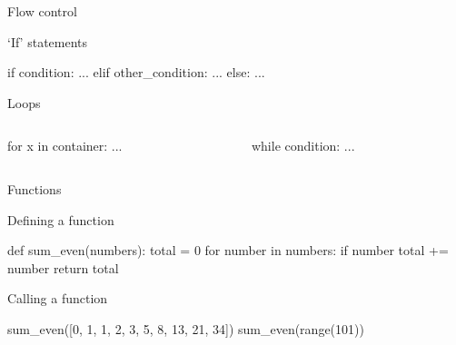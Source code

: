 \begin{frame}[fragile]{Flow control}
    \vspace{0.5em}
    \begin{block}{`If' statements}
        \begin{py3}
            if condition:
                ...
            elif other_condition:
                ...
            else:
                ...
        \end{py3}
    \end{block}
    \vspace{-0.75em}
    \begin{block}{Loops}
        \vspace{-0.9em}
        \begin{columns}
            \begin{column}{0.465\textwidth}
                \begin{py3}
                    for x in container:
                        ...
                \end{py3}
            \end{column}
            \begin{column}{0.465\textwidth}
                \begin{py3}
                    while condition:
                        ...
                \end{py3}
            \end{column}
        \end{columns}
    \end{block}
\end{frame}

\begin{frame}[fragile]{Functions}
    \vspace{0.5em}
    \begin{block}{Defining a function}
        \begin{py3}
            def sum_even(numbers):
                total = 0
                for number in numbers:
                    if number %
                        total += number
                return total
        \end{py3}
    \end{block}
    \vspace{-0.75em}
    \begin{block}{Calling a function}
        \begin{py3}
            sum_even([0, 1, 1, 2, 3, 5, 8, 13, 21, 34])
            sum_even(range(101))
        \end{py3}
    \end{block}
\end{frame}

